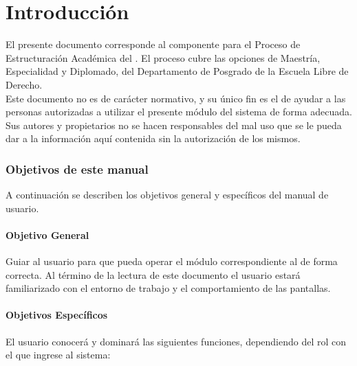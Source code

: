 \chapter{Introducción} \label{chp:introduccion}

	El presente documento corresponde al componente \varCveDocumento \space \varDocumento para el Proceso de Estructuración Académica del \varSistema. El proceso cubre las opciones de Maestría, Especialidad y Diplomado, del Departamento de Posgrado de la Escuela Libre de Derecho.\\

	Este documento no es de carácter normativo, y su único fin es el de ayudar a las personas autorizadas a utilizar el presente módulo del sistema de forma adecuada. Sus autores y propietarios no se hacen responsables del mal uso que se le pueda dar a la información aquí contenida sin la autorización de los mismos.

	\subsection{Objetivos de este manual}
	
		A continuación se describen los objetivos general y específicos del manual de usuario.
		
		\subsubsection{Objetivo General}
	
			Guiar al usuario para que pueda operar el módulo correspondiente al \varEntregable de forma correcta. Al término de la lectura de este documento el usuario estará familiarizado con el entorno de trabajo y el comportamiento de las pantallas.

		\subsubsection{Objetivos Específicos}

			El usuario conocerá y dominará las siguientes funciones, dependiendo del rol con el que ingrese al sistema:

